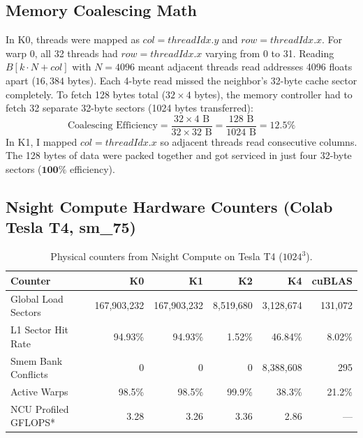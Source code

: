 \documentclass[11pt]{article}
\begin{document}
\subsection{Memory Coalescing Math}

In K0, threads were mapped as $col = threadIdx.y$ and $row = threadIdx.x$. For warp 0, all 32 threads had $row = threadIdx.x$ varying from 0 to 31. Reading $B[k \cdot N + col]$ with $N=4096$ meant adjacent threads read addresses 4096 floats apart ($16{,}384$ bytes). Each 4-byte read missed the neighbor's 32-byte cache sector completely.
To fetch 128 bytes total ($32 \times 4$ bytes), the memory controller had to fetch 32 separate 32-byte sectors (1024 bytes transferred):
\[
\text{Coalescing Efficiency} = \frac{32 \times 4\text{ B}}{32 \times 32\text{ B}} = \frac{128\text{ B}}{1024\text{ B}} = \mathbf{12.5\%}
\]
In K1, I mapped $col = threadIdx.x$ so adjacent threads read consecutive columns. The 128 bytes of data were packed together and got serviced in just four 32-byte sectors ($\mathbf{100\%}$ efficiency).

\subsection{Nsight Compute Hardware Counters (Colab Tesla T4, sm\_75)}

\begin{table}[h]
\centering
\begin{tabular}{|l|r|r|r|r|r|}
\hline
\textbf{Counter} & \textbf{K0} & \textbf{K1} & \textbf{K2} & \textbf{K4} & \textbf{cuBLAS} \\
\hline
Global Load Sectors & 167,903,232 & 167,903,232 & 8,519,680 & 3,128,674 & 131,072 \\
L1 Sector Hit Rate & 94.93\% & 94.93\% & 1.52\% & 46.84\% & 8.02\% \\
Smem Bank Conflicts & 0 & 0 & 0 & 8,388,608 & 295 \\
Active Warps & 98.5\% & 98.5\% & 99.9\% & 38.3\% & 21.2\% \\
NCU Profiled GFLOPS* & 3.28 & 3.26 & 3.36 & 2.86 & --- \\
\hline
\end{tabular}
\caption{Physical counters from Nsight Compute on Tesla T4 ($1024^3$).}
\end{table}
\end{document}
